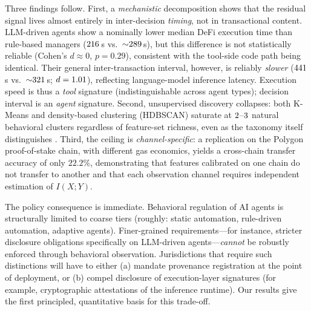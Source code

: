 \documentclass[11pt,a4paper]{article}
\begin{document}
Three findings follow. First, a \emph{mechanistic} decomposition shows that
the residual signal lives almost entirely in inter-decision \emph{timing},
not in transactional content. LLM-driven agents show a nominally lower median DeFi execution time
than rule-based managers ($216$\,s vs.\ ${\sim}289$\,s), but this difference
is not statistically reliable (Cohen's $d \approx 0$, $p = 0.29$),
consistent with the tool-side code path being identical. Their general
inter-transaction interval, however, is reliably \emph{slower}
($441$\,s vs.\ ${\sim}321$\,s; $d = 1.01$), reflecting language-model
inference latency. Execution speed is thus a \emph{tool} signature
(indistinguishable across agent types); decision interval is an
\emph{agent} signature. Second, unsupervised discovery collapses: both
K-Means and density-based clustering (HDBSCAN) saturate at $2$--$3$ natural
behavioral clusters regardless of feature-set richness, even as the
taxonomy itself distinguishes \nClasses{}. Third, the ceiling is \emph{channel-specific}: a replication on the
Polygon proof-of-stake chain, with different gas economics, yields a
cross-chain transfer accuracy of only $22.2\%$, demonstrating that
features calibrated on one chain do not transfer to another and that
each observation channel requires independent estimation of $I(X;Y)$.

The policy consequence is immediate. Behavioral regulation of AI agents is
structurally limited to coarse tiers (roughly: static automation,
rule-driven automation, adaptive agents). Finer-grained requirements---for
instance, stricter disclosure obligations specifically on LLM-driven
agents---\emph{cannot} be robustly enforced through behavioral observation.
Jurisdictions that require such distinctions will have to either (a)
mandate provenance registration at the point of deployment, or (b) compel
disclosure of execution-layer signatures (for example, cryptographic
attestations of the inference runtime). Our results give the first
principled, quantitative basis for this trade-off.
\end{document}
